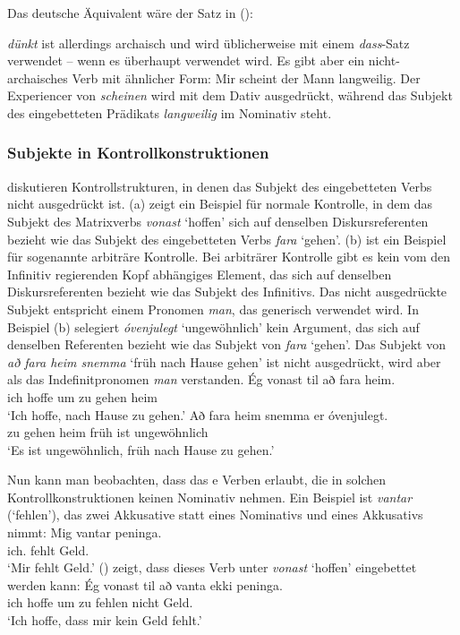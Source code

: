 \noindent
Das deutsche Äquivalent wäre der Satz in ():
{
\z}

\noindent
\emph{dünkt} ist allerdings archaisch und wird üblicherweise mit einem \emph{dass}-Satz verwendet -- wenn es überhaupt
verwendet wird. Es gibt aber ein nicht-archaisches Verb mit ähnlicher Form:
\ea
Mir scheint der Mann langweilig.
\z
Der Experiencer von \emph{scheinen} wird mit dem Dativ ausgedrückt, während das Subjekt des
eingebetteten Prädikats \emph{langweilig} im Nominativ steht.

\subsubsection{Subjekte in Kontrollkonstruktionen}
\label{sec-subject-control}

\citet*[Abschnitt~2.7]{ZMT85a} diskutieren Kontrollstrukturen, in denen das Subjekt des eingebetteten Verbs
nicht ausgedrückt ist. (a) zeigt ein Beispiel für normale Kontrolle, in dem das Subjekt des Matrixverbs
\emph{vonast} `hoffen' sich auf denselben Diskursreferenten bezieht wie das Subjekt des eingebetteten Verbs \emph{fara} `gehen'. (b) ist ein Beispiel für sogenannte arbiträre Kontrolle. Bei arbiträrer Kontrolle gibt es
kein vom den Infinitiv regierenden Kopf abhängiges Element, das sich auf denselben Diskursreferenten
bezieht wie das Subjekt des Infinitivs. Das nicht ausgedrückte Subjekt entspricht einem Pronomen \emph{man}, das
generisch verwendet wird. In Beispiel (b) selegiert \emph{óvenjulegt} `ungewöhnlich' kein Argument,
das sich auf denselben Referenten bezieht wie das Subjekt von \emph{fara} `gehen'. Das Subjekt von \emph{að fara
  heim snemma} `früh nach Hause gehen' ist nicht ausgedrückt, wird aber als das Indefinitpronomen \emph{man} verstanden.
\eal
\ex
\gll Ég  vonast til að fara heim.\\
     ich hoffe um zu gehen heim\\\icelandic
\glt `Ich hoffe, nach Hause zu gehen.'
\ex
\gll Að fara heim snemma er óvenjulegt.\\
     zu gehen heim früh ist ungewöhnlich\\
\glt `Es ist ungewöhnlich, früh nach Hause zu gehen.'
\zl

Nun kann man beobachten, dass das e Verben erlaubt, die in solchen Kontrollkonstruktionen keinen Nominativ nehmen. Ein Beispiel ist \emph{vantar} (`fehlen'), das zwei Akkusative statt eines
Nominativs und eines Akkusativs nimmt:
\ea
\gll Mig      vantar peninga.\\
     ich.\ACC{} fehlt Geld.\ACC\\\icelandic
\glt `Mir fehlt Geld.'
\z
() zeigt, dass dieses Verb unter \emph{vonast} `hoffen' eingebettet werden kann:
\ea
\gll Ég vonast til að vanta ekki peninga.\\
     ich hoffe um zu fehlen nicht Geld.\ACC\\\icelandic
\glt `Ich hoffe, dass mir kein Geld fehlt.'
\z

